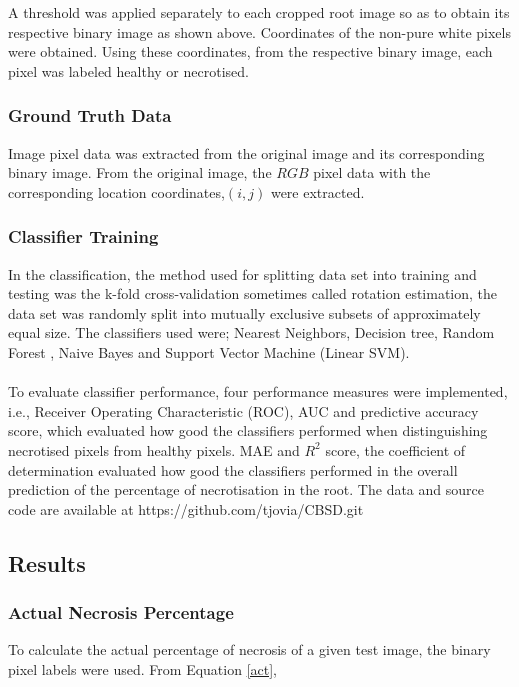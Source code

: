 \documentclass[conference]{IEEEtran}
\begin{document}
A threshold was applied separately to each cropped root image so as to obtain its respective binary image as shown above. Coordinates of the non-pure white pixels were obtained. Using these coordinates, from the respective binary image, each pixel was labeled healthy or necrotised.

\subsubsection{Ground Truth Data}
Image pixel data was extracted from the original image and its corresponding binary image. From the original image, the $RGB$ pixel data with the corresponding location coordinates,$(i,j)$ were extracted.

\subsubsection{Classifier Training}
In the classification, the method used for splitting data set into training and testing was the k-fold cross-validation sometimes called rotation estimation, the data set was randomly split into mutually exclusive subsets of approximately equal size\cite{kohavi1995study}. The classifiers used were; Nearest Neighbors\cite{han2006data}, Decision tree\cite{anyanwu2009comparative}\cite{quinlan1986induction}, Random Forest \cite{breiman2001random}\cite{liaw2002classification}, Naive Bayes \cite{farid2013hybrid} and Support Vector Machine (Linear SVM)\cite{vapnik1998statistical}\cite{bartlett1999generalization}. \\ \\To evaluate classifier performance, four performance measures were implemented, i.e., Receiver Operating Characteristic (ROC), AUC and predictive accuracy score, which evaluated how good the classifiers performed when distinguishing necrotised pixels from healthy pixels. MAE and $R^{2}$ score, the coefficient of determination evaluated how good the classifiers performed in the overall prediction of the percentage of necrotisation in the root. The data and source code are available at https://github.com/tjovia/CBSD.git


\subsection{Results}
\subsubsection{Actual Necrosis Percentage}
To calculate the actual percentage of necrosis of a given test image, the binary pixel labels were used. From Equation \ref{act},
\end{document}
